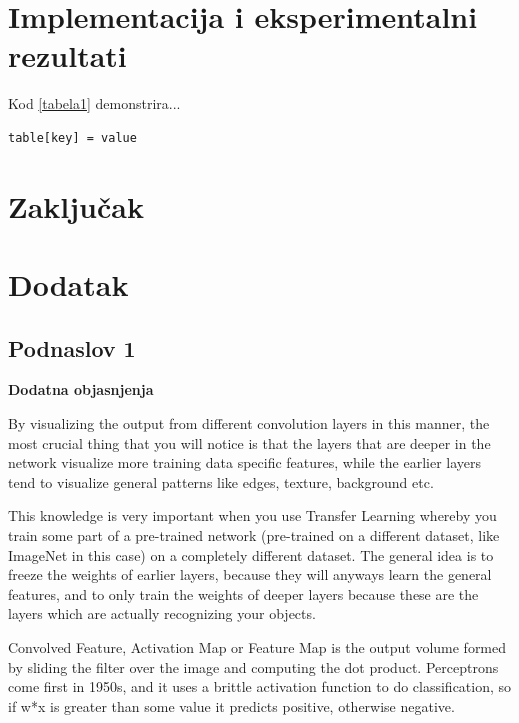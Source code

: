 \documentclass[a4paper]{article}
\begin{document}
\section{Implementacija i eksperimentalni rezultati}
\label{sec:podnaslov8}

Kod \ref{tabela1} demonstrira...

\begin{lstlisting}[caption={Primer koda},frame=single, label=tabela1]
table[key] = value
\end{lstlisting}

\newpage

\section{Zaključak}
\label{sec:zakljucak}

\newpage

\appendix
 


\newpage

\appendix
\section{Dodatak}
\subsection{Podnaslov 1}

\textbf{Dodatna objasnjenja} %


By visualizing the output from different convolution layers in this manner, the most crucial thing that you will notice is that the layers that are deeper in the network visualize more training data specific features, while the earlier layers tend to visualize general patterns like edges, texture, background etc.

This knowledge is very important when you use Transfer Learning whereby you train some part of a pre-trained network (pre-trained on a different dataset, like ImageNet in this case) on a completely different dataset. The general idea is to freeze the weights of earlier layers, because they will anyways learn the general features, and to only train the weights of deeper layers because these are the layers which are actually recognizing your objects.

Convolved Feature, Activation Map or Feature Map is the output volume formed by sliding the filter over the image and computing the dot product.
Perceptrons come first in 1950s, and it uses a brittle activation function to do classification, so if w*x is greater than some value it predicts positive, otherwise negative.
\end{document}
